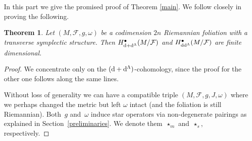 \documentclass[pdftex]{sigma}
\numberwithin{equation}{section}
\newtheorem{Theorem}{Theorem}[section]
{ \theoremstyle{definition}
\newtheorem{Definition}[Theorem]{Definition}
\newtheorem{Example}[Theorem]{Example}
\newtheorem{Remark}[Theorem]{Remark} }
\begin{document}
In this part we give the promised proof of Theorem \ref{main}. We follow closely \cite{tseng} in proving the following.
\begin{Theorem}
Let $(M,\mathcal{F},g,\omega)$ be a codimension $2n$ Riemannian foliation with a transverse symplectic structure. Then $H^{\bullet}_{{\rm d}+{\rm d}^{\Lambda}}(M\slash\mathcal{F})$ and $H^{\bullet}_{{\rm d}{\rm d}^{\Lambda}}(M\slash\mathcal{F})$ are finite dimensional.
\end{Theorem}
\begin{proof}
We concentrate only on the $({\rm d}+{\rm d}^{\Lambda})$-cohomology, since the proof for the other one follows along the same lines.

Without loss of generality we can have a compatible triple $(M,\mathcal{F},g,J,\omega)$ where we perhaps changed the metric but left $\omega$ intact (and the foliation is still Riemannian). Both~$g$ and~$\omega$ induce star operators via non-degenerate pairings as explained in Section~\ref{preliminaries}. We denote them~$\star_{m}$ and~$\star_{s}$, respectively.


\end{proof}
\end{document}
